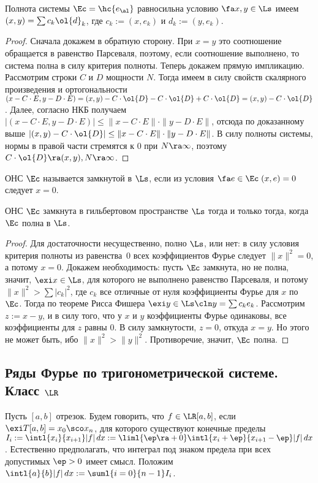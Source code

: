 \documentclass[a4paper]{article}
\newcommand{\intlab}{\intl{a}{b}}
\begin{document}
\begin{theorem}
Полнота системы $\Ec = \hc{e_\al}$ равносильна условию $\fa x, y \in \Ls$ имеем
$(x,y) = \sum c_k \ol{d}_k$, где $c_k := (x,e_k)$ и $d_k := (y,e_k)$.
\end{theorem}
\begin{proof}
Сначала докажем в обратную сторону. При $x = y$ это соотношение обращается в равенство Парсеваля,
поэтому, если соотношение выполнено, то система полна в силу критерия полноты. Теперь докажем
прямую импликацию. Рассмотрим строки $C$ и $D$ мощности $N$. Тогда
имеем в силу свойств скалярного произведения и ортогональности
$(x - C \cdot E, y - D \cdot E) = (x,y) - C \cdot \ol{D} - C \cdot \ol{D} + C \cdot \ol{D} = (x,y) - C\cdot \ol{D}$.
Далее, согласно НКБ получаем $|(x - C\cdot E, y - D \cdot E)| \le \|x- C\cdot E\|\cdot\|y - D\cdot E\|$,
отсюда по доказанному выше $|(x,y) - C \cdot \ol{D}| \le \|x- C\cdot E\|\cdot\|y - D\cdot E\|$.
В силу полноты системы, нормы в правой части стремятся к 0 при $N \ra \infty$,
поэтому $C \cdot \ol{D} \ra (x,y), N \ra \infty$.
\end{proof}

ОНС $\Ec$ называется замкнутой в $\Ls$, если из условия $\fa e \in \Ec \; (x,e) = 0$ следует $x = 0$.

\begin{theorem}
ОНС $\Ec$ замкнута в гильбертовом пространстве $\Ls$ тогда и только тогда, когда $\Ec$ полна в $\Ls$.
\end{theorem}
\begin{proof}
Для достаточности несущественно, полно $\Ls$, или нет: в силу условия  критерия полноты из равенства~0
всех коэффициентов Фурье следует $\|x\|^2 = 0$, а потому $x = 0$. Докажем необходимость: пусть $\Ec$ замкнута,
но не полна, значит, $\exi x \in \Ls$, для которого не выполнено равенство Парсеваля, и потому
$\|x\|^2 > \sum |c_k|^2$, где $c_k$ все отличные от нуля коэффициенты Фурье для $x$ по $\Ec$.
Тогда по теореме Рисса Фишера $\exi y \in \Ls\cln y = \sum c_k e_k$. Рассмотрим $z := x - y$, и в силу того, что
у $x$ и $y$ коэффициенты Фурье одинаковы, все коэффициенты для $z$ равны 0. В силу замкнутости, $z = 0$, откуда $x = y$.
Но этого не может быть, ибо $\|x\|^2 > \|y\|^2$. Противоречие, значит, $\Ec$ полна.
\end{proof}

\subsection{Ряды Фурье по тригонометрической системе. Класс $\LR$}
Пусть $[a,b]$ отрезок. Будем говорить, что $f \in\LR[a,b]$, если $\exi T[a,b] = x_0\sco x_n$,
для которого существуют конечные пределы $I_i := \intl{x_i}{x_{i+1}}|f|\,d x := \liml{\ep \ra
+0}\intl{x_i+\ep}{x_{i+1}-\ep}|f|\,d x$. Естественно предполагать, что интеграл под знаком предела
при всех допустимых $\ep > 0$ имеет смысл. Положим $\intlab |f|\,d x := \suml{i=0}{n-1} I_i$.
\end{document}
